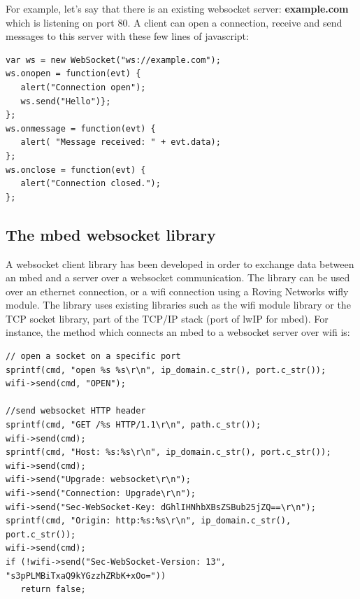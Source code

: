 \documentclass[pdftex,10pt,a4paper]{report}
\begin{document}
For example, let's say that there is an existing websocket server: \textbf{example.com} which is listening on port 80. A client can open a connection, receive and send messages to this server with these few lines of javascript:

\begin{center}
\begin{lstlisting}[label=Javascript Websocket Hello World,caption=Javascript Websocket Hello World]
var ws = new WebSocket("ws://example.com");
ws.onopen = function(evt) { 
   alert("Connection open"); 
   ws.send("Hello")}; 
};
ws.onmessage = function(evt) { 
   alert( "Message received: " + evt.data); 
}; 
ws.onclose = function(evt) { 
   alert("Connection closed."); 
};
\end{lstlisting}
\end{center}


\subsection{The mbed websocket library}
A websocket client library has been developed in order to exchange data between an mbed and a server over a websocket communication. The library can be used over an ethernet connection, or a wifi connection using a Roving Networks wifly module. The library uses existing libraries such as the wifi module library or the TCP socket library, part of the TCP/IP stack (port of lwIP for mbed). For instance, the method which connects an mbed to a websocket server over wifi is:


\begin{center}
\begin{lstlisting}[label=Connection to a websocket server,caption=Connection to a websocket server]
// open a socket on a specific port
sprintf(cmd, "open %s %s\r\n", ip_domain.c_str(), port.c_str());
wifi->send(cmd, "OPEN");

//send websocket HTTP header
sprintf(cmd, "GET /%s HTTP/1.1\r\n", path.c_str());
wifi->send(cmd);
sprintf(cmd, "Host: %s:%s\r\n", ip_domain.c_str(), port.c_str());
wifi->send(cmd);
wifi->send("Upgrade: websocket\r\n");
wifi->send("Connection: Upgrade\r\n");
wifi->send("Sec-WebSocket-Key: dGhlIHNhbXBsZSBub25jZQ==\r\n");
sprintf(cmd, "Origin: http:%s:%s\r\n", ip_domain.c_str(), port.c_str());
wifi->send(cmd);
if (!wifi->send("Sec-WebSocket-Version: 13", "s3pPLMBiTxaQ9kYGzzhZRbK+xOo="))
   return false;

\end{lstlisting}
\end{center}
\end{document}
